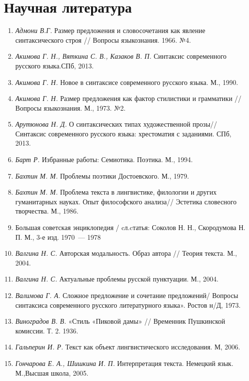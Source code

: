     \section*{Научная литература}
      \begin{enumerate}
        \item \textit{Адмони В.Г.} Размер предложения и словосочетания как явление синтаксического строя // Вопросы языкознания.  1966. №4. 
        \item \textit{Акимова Г. Н., Вяткина С. В., Казаков В. П.} Синтаксис современного русского языка.СПб, 2013. 
        \item \textit{Акимова Г. Н.} Новое в синтаксисе современного русского языка. М., 1990.
        \item \textit{Акимова Г. Н.} Размер предложения как фактор стилистики и грамматики // Вопросы языкознания. М., 1973. №2.
        \item \textit{Арутюнова Н. Д.} О синтаксических типах художественной прозы// Синтаксис современного русского языка: хрестоматия с заданиями. СПб, 2013.
        \item \textit{Барт Р.} Избранные работы: Семиотика. Поэтика. М., 1994.
        \item \textit{Бахтин М. М.} Проблемы поэтики Достоевского. М., 1979.
        \item \textit{Бахтин М. М.} Проблема текста в лингвистике, филологии и других гуманитарных науках. Опыт философского анализа// Эстетика словесного творчества. М., 1986.  
        \item Большая советская энциклопедия / cл.cтатья: Соколов Н. Н., Скородумова Н. П. М., 3-е изд. 1970~--- 1978
        \item \textit{Валгина Н. С.} Авторская модальность. Образ автора // Теория текста. М., 2004. 
        \item \textit{Валгина Н. С.} Актуальные проблемы русской пунктуации. М., 2004.
        \item \textit{Валимова Г. А.} Сложное предложение и сочетание предложений/ Вопросы синтаксиса современного русского литературного языка». Ростов н/Д, 1973.
        \item \textit{Виноградов В. В.} «Стиль «Пиковой дамы» // Временник Пушкинской комиссии. Т. 2. 1936. 
        \item \textit{Гальперин И. Р.} Текст как объект лингвистического исследования. М, 2006. 
        \item \textit{Гончарова Е. А., Шишкина И. П. }Интерпретация текста. Немецкий язык. М.,Высшая школа, 2005.

\end{enumerate}
